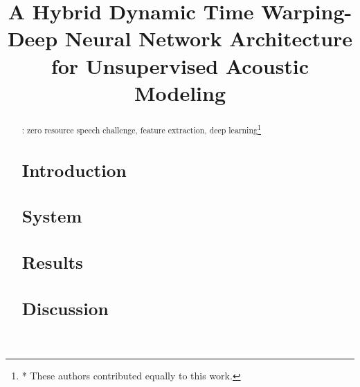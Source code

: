 \documentclass[a4paper]{article}
\title{A Hybrid Dynamic Time Warping-Deep Neural Network Architecture for Unsupervised Acoustic Modeling}
\begin{document}
\maketitle

\begin{abstract}
: zero resource speech challenge, feature extraction, deep learning\let\thefootnote\relax\footnote{* These authors contributed equally to this work.}


\section{Introduction}
\section{System}
\section{Results}
\section{Discussion}




\end{abstract}
\end{document}
